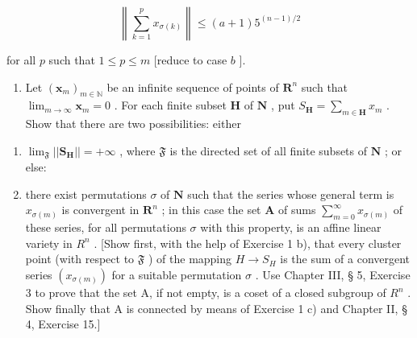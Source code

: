 \[
\left\| \sum_ {k = 1} ^ {p} x _ {\sigma (k)} \right\| \leqslant (a + 1) 5 ^ {(n - 1) / 2}
\]

for all \(p\) such that \(1 \leqslant p \leqslant m\) {[}reduce to case \(b\) {]}.

\begin{enumerate}
\def\labelenumi{\arabic{enumi})}
\setcounter{enumi}{1}
\tightlist
\item
  Let \((\pmb{x}_m)_{m\in \mathbb{N}}\) be an infinite sequence of points of \(\mathbf{R}^n\) such that \(\lim_{m\to \infty}\pmb{x}_m = 0\) . For each finite subset \(\mathbf{H}\) of \(\mathbf{N}\) , put \(S_{\mathbf{H}} = \sum_{m\in \mathbf{H}}x_m\) . Show that there are two possibilities: either
\end{enumerate}

\begin{enumerate}
\def\labelenumi{(\roman{enumi})}
\item
  \(\lim_{\mathfrak{F}}||\mathbf{S}_{\mathbf{H}}|| = +\infty\) , where \(\mathfrak{F}\) is the directed set of all finite subsets of \(\mathbf{N}\) ; or else:
\item
  there exist permutations \(\sigma\) of \(\mathbf{N}\) such that the series whose general term is \(x_{\sigma(m)}\) is convergent in \(\mathbf{R}^n\) ; in this case the set \(\mathbf{A}\) of sums \(\sum_{m=0}^{\infty} x_{\sigma(m)}\) of these series, for all permutations \(\sigma\) with this property, is an affine linear variety in \(R^n\) . {[}Show first, with the help of Exercise 1 b), that every cluster point (with respect to \(\mathfrak{F}\) ) of the mapping \(H \to S_H\) is the sum of a convergent series \((x_{\sigma(m)})\) for a suitable permutation \(\sigma\) . Use Chapter III, § 5, Exercise 3 to prove that the set A, if not empty, is a coset of a closed subgroup of \(R^n\) . Show finally that A is connected by means of Exercise 1 c) and Chapter II, § 4, Exercise 15.{]}
\end{enumerate}

